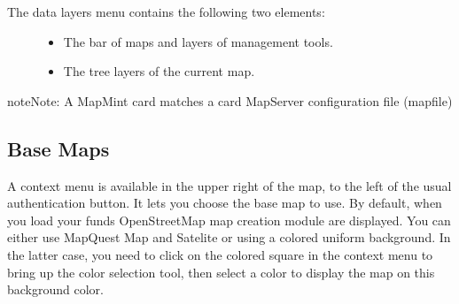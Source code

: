 \documentclass[letterpaper,10pt,english]{sphinxmanual}
\begin{document}
\begin{description}
\item[{The data layers menu contains the following two elements:}] \leavevmode\begin{itemize}
\item {} 
The bar of maps and layers of management tools.

\item {} 
The tree layers of the current map.

\end{itemize}

\end{description}

\begin{notice}{note}{Note:}
A MapMint card matches a card MapServer configuration file (mapfile)
\end{notice}


\subsection{Base Maps}
\label{maps/layerstree:fonds-de-carte}
A context menu is available in the upper right of the map, to the left of the usual authentication button. It lets you choose the base map to use. By default, when you load your funds OpenStreetMap map creation module are displayed. You can either use MapQuest Map and Satelite or using a colored uniform background. In the latter case, you need to click on the colored square in the context menu to bring up the color selection tool, then select a color to display the map on this background color.

\end{document}
